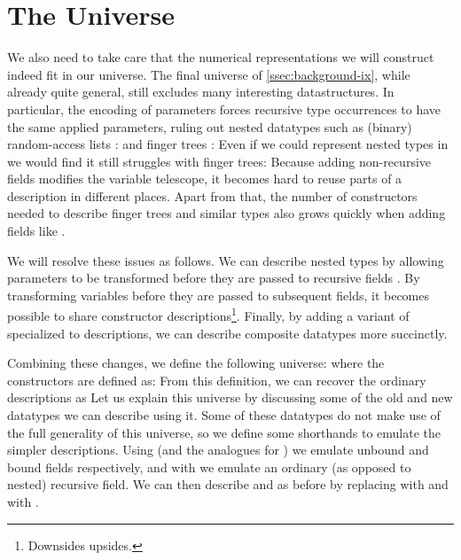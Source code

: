 \section{The Universe}\label{ssec:desc}
We also need to take care that the numerical representations we will construct indeed fit in our universe. The final universe  of \autoref{ssec:background-ix}, while already quite general, still excludes many interesting datastructures. In particular, the encoding of parameters forces recursive type occurrences to have the same applied parameters, ruling out nested datatypes such as (binary) random-access lists \cite{calcdata,purelyfunctional}:
and finger trees \cite{fingertrees}:
Even if we could represent nested types in  we would find it still struggles with finger trees: Because adding non-recursive fields modifies the variable telescope, it becomes hard to reuse parts of a description in different places. Apart from that, the number of constructors needed to describe finger trees and similar types also grows quickly when adding fields like .

We will resolve these issues as follows. We can describe nested types by allowing parameters to be transformed before they are passed to recursive fields \cite{?}. By transforming variables before they are passed to subsequent fields, it becomes possible to share constructor descriptions\footnote{Downsides upsides.}. Finally, by adding a variant of  specialized to descriptions, we can describe composite datatypes more succinctly.

Combining these changes, we define the following universe:
where the constructors are defined as:
From this definition, we can recover the ordinary descriptions as
Let us explain this universe by discussing some of the old and new datatypes we can describe using it. Some of these datatypes do not make use of the full generality of this universe, so we define some shorthands to emulate the simpler descriptions. Using 
(and the analogues for ) we emulate unbound and bound fields respectively, and with 
we emulate an ordinary (as opposed to nested) recursive field. We can then describe \bN{} 
and  as before
by replacing  with  and  with .

